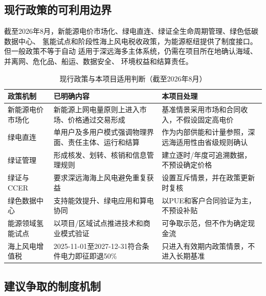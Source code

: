 \subsection{现行政策的可利用边界}

截至2026年8月，新能源电价市场化、绿电直连、绿证全生命周期管理、绿色低碳数据中心、
氢能试点和阶段性海上风电税收政策，为能源枢纽提供了制度接口。但一般政策不等于自动
适用于深远海多主体系统，仍需在项目所在地确认海域、并离网、危化品、船运、数据安全、
环境权益和结算责任。

\begin{table}[H]
\centering
\caption{现行政策与本项目适用判断（截至2026年8月）}
\label{tab:c6-policy}
\footnotesize
\begin{tabularx}{\textwidth}{p{2.6cm} X X}
\toprule
政策机制 & 已明确内容 & 本项目处理\\
\midrule
新能源电价市场化 & 新能源上网电量原则上进入市场、价格通过交易形成\cite{ndrc-price} & 基准情景采用市场和合同收入，不假设固定高电价\\
绿电直连 & 单用户及多用户模式强调物理界面、责任主体、运行和结算\cite{ndrc-direct,ndrc-multiuser} & 作为内部供能和计量参照，深远海适用性由省级规则确认\\
绿证管理 & 形成核发、划转、核销和信息管理规则\cite{nea-green-cert} & 建立逐时/年度可追溯数据，不预设确定价格\\
绿证与CCER & 要求深远海海上风电避免重复获益\cite{green-cert-ccer} & 设置互斥情景，并在政策更新时复核\\
绿色数据中心 & 支持能效提升、绿电应用和算电协同\cite{ndrc-data-center} & 以PUE和客户合同验证为主，不预设补贴\\
能源领域氢能试点 & 以项目/区域试点推进技术和商业模式验证\cite{nea-hydrogen-pilot} & 可争取示范，但不作为确定现金流\\
海上风电增值税 & 2025-11-01至2027-12-31符合条件电力即征即退50\%\cite{mof-vat} & 只进入有效期内政策情景，不进入长期基准\\
\bottomrule
\end{tabularx}
\end{table}

\subsection{建议争取的制度机制}

